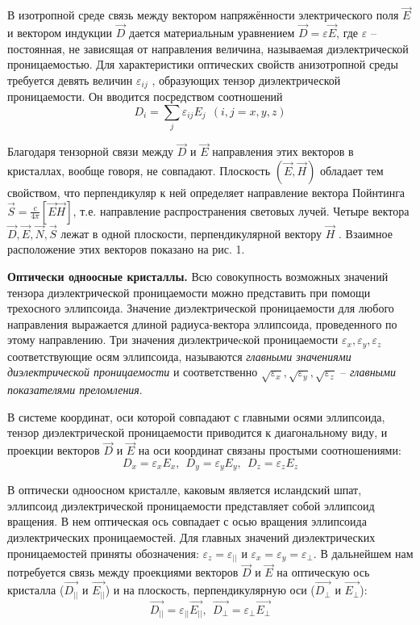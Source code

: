 \documentclass[14pt]{article}
\begin{document}
В изотропной среде связь между вектором
напряжённости электрического поля
$\vec{E}$ и вектором индукции
$\vec{D}$ дается материальным
уравнением
$\vec{D} = \varepsilon\vec{E}$, где $\varepsilon$ --
постоянная, не зависящая от направления
величина, называемая диэлектрической
проницаемостью. Для характеристики
оптических свойств анизотропной среды
требуется девять величин $\varepsilon_{ij}$ , образующих
тензор диэлектрической проницаемости.
Он вводится посредством соотношений
\begin{equation}
	D_i = \sum_j \varepsilon_{ij}E_j~~(i,j = x,y,z)
\end{equation}

Благодаря тензорной связи между
$\vec{D}$ и
$\vec{E}$ направления этих векторов в кристаллах, вообще говоря, не совпадают. Плоскость $(\vec{E}, \vec{H})$ обладает
тем свойством, что перпендикуляр к ней определяет направление вектора
Пойнтинга $\vec{S} = \frac{c}{4\pi}[\vec{E}\vec{H}]$, т.е. направление распространения световых
лучей. Четыре вектора $\vec{D},\vec{E},\vec{N},\vec{S}$ лежат в одной плоскости, перпендикулярной
вектору
$\vec{H}$ . Взаимное расположение этих векторов показано
на рис. 1.

\textbf{Оптически одноосные кристаллы.} Всю совокупность возможных
значений тензора диэлектрической проницаемости можно представить
при помощи трехосного эллипсоида. Значение диэлектрической проницаемости
для любого направления выражается длиной радиуса-вектора
эллипсоида, проведенного по этому направлению. Три значения диэлектричеcкой
проницаемости $\varepsilon_x, \varepsilon_y, \varepsilon_z$ соответствующие осям эллипсоида,
называются \textsl{главными значениями диэлектрической проницаемости}
и
соответственно
$\sqrt{\varepsilon_x}, \sqrt{\varepsilon_y}, \sqrt{\varepsilon_z}$ -- \textsl{главными показателями преломления}.

В системе координат, оси которой совпадают с главными осями эллипсоида,
тензор диэлектрической проницаемости приводится к диагональному
виду, и проекции векторов $\vec{D}$ и $\vec{E}$ на оси
координат связаны простыми соотношениями:
$$
	D_x = \varepsilon_xE_x,~~D_y = \varepsilon_yE_y,~~D_z = \varepsilon_zE_z
$$

В оптически одноосном кристалле,
каковым является исландский шпат, эллипсоид диэлектрической проницаемости представляет собой
эллипсоид вращения.
В нем оптическая ось совпадает с осью вращения
эллипсоида диэлектрических проницаемостей. Для главных значений
диэлектрических проницаемостей приняты обозначения: $\varepsilon_z = \varepsilon_{||}$ и
$\varepsilon_x = \varepsilon_y = \varepsilon_{\perp}$. В дальнейшем нам потребуется связь между проекциями
векторов
$\vec{D}$ и $\vec{E}$ на оптическую ось кристалла ($\vec{D_{||}}$ и $\vec{E_{||}}$) и на плоскость,
перпендикулярную оси ($\vec{D_{\perp}}$ и $\vec{E_{\perp}}$):
\begin{equation}
	\vec{D_{||}} = \varepsilon_{||}\vec{E_{||}},~~\vec{D_{\perp}} = \varepsilon_{\perp}\vec{E_{\perp}}
\end{equation}
\end{document}
